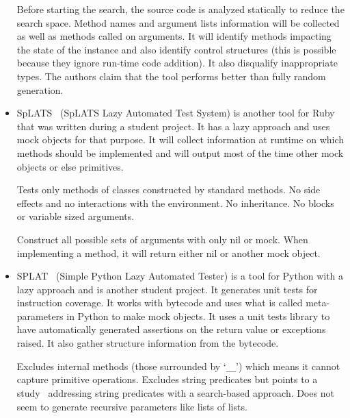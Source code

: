 \documentclass{llncs2e/llncs}
\begin{document}
\begin{itemize}
    Before starting the search, the source code is analyzed statically to reduce
    the search space. Method names and argument lists information will be
    collected as well as methods called on arguments. It will identify methods
    impacting the state of the instance and also identify control structures
    (this is possible because they ignore run-time code addition).  It also
    disqualify inappropriate types. The authors claim that the tool performs
    better than fully random generation.


  \item SpLATS~\cite{splats} (SpLATS Lazy Automated Test System) is another tool
    for Ruby that was written during a student project. It has a lazy approach
    and uses mock objects for that purpose. It will collect information at
    runtime on which methods should be implemented and will output most of the
    time other mock objects or else primitives.

    Tests only methods of classes constructed by standard methods. No side
    effects and no interactions with the environment. No inheritance. No blocks
    or variable sized arguments.

    Construct all possible sets of arguments with only nil or mock. When
    implementing a method, it will return either nil or another mock object.

  \item SPLAT~\cite{splat} (Simple Python Lazy Automated Tester) is a tool for
    Python with a lazy approach and is another student project. It generates
    unit tests for instruction coverage.  It works with bytecode and uses what
    is called meta-parameters in Python to make mock objects. It uses a unit
    tests library to have automatically generated assertions on the return value
    or exceptions raised. It also gather structure information from the
    bytecode.

    Excludes internal methods (those surrounded by `\texttt{\_\_}') which means
    it cannot capture primitive operations. Excludes string predicates but
    points to a study~\cite{alshraideh2006search} addressing string predicates
    with a search-based approach. Does not seem to generate recursive parameters
    like lists of lists.
\end{itemize}
\end{document}
